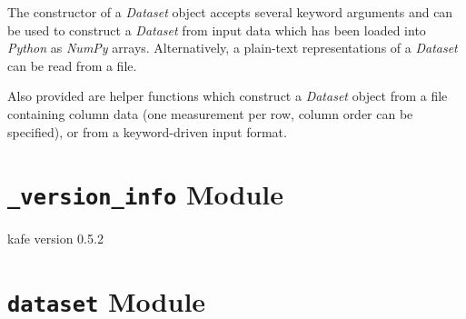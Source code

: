 \documentclass[a4paper,10pt,english]{sphinxmanual}
\begin{document}
The constructor of a \emph{Dataset} object accepts several keyword arguments and can
be used to construct a \emph{Dataset} from input data which has been loaded into
\emph{Python} as \emph{NumPy} arrays. Alternatively, a plain-text representations of a
\emph{Dataset} can be read from a file.

Also provided are helper functions which construct a \emph{Dataset} object from a
file containing column data (one measurement per row, column order can be
specified), or from a keyword-driven input format.


\section{\texttt{\_version\_info} Module}
\label{index:module-kafe._version_info}\label{index:version-info-module}\label{index:module-__version_info}

\begin{fulllineitems}
\label{index:kafe._version_info.get_version}
kafe version 0.5.2

\end{fulllineitems}



\section{\texttt{dataset} Module}
\label{index:dataset-module}\label{index:module-kafe.dataset}\label{index:module-dataset}
\end{document}
